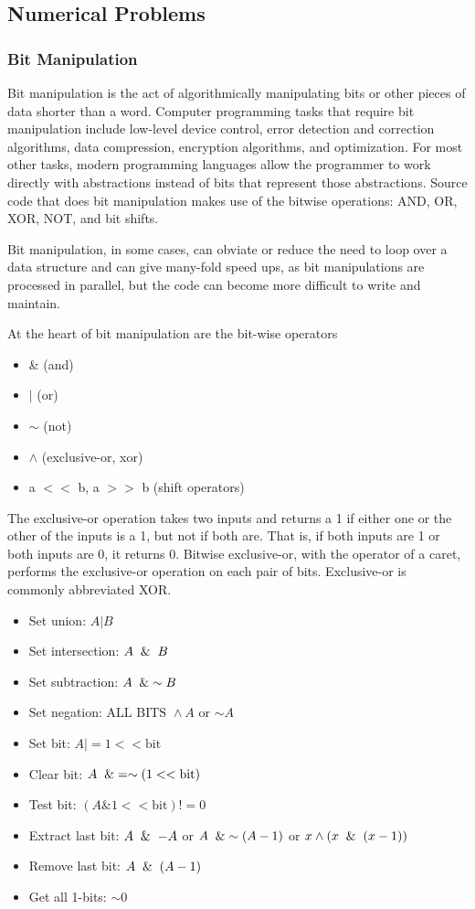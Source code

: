 \documentclass{article}
\begin{document}
    \subsection{Numerical Problems}
    
    \subsubsection{Bit Manipulation}
    Bit manipulation is the act of algorithmically manipulating bits or other pieces of data shorter than a word. Computer programming tasks that require bit manipulation include low-level device control, error detection and correction algorithms, data compression, encryption algorithms, and optimization. For most other tasks, modern programming languages allow the programmer to work directly with abstractions instead of bits that represent those abstractions. Source code that does bit manipulation makes use of the bitwise operations: AND, OR, XOR, NOT, and bit shifts.
    
    Bit manipulation, in some cases, can obviate or reduce the need to loop over a data structure and can give many-fold speed ups, as bit manipulations are processed in parallel, but the code can become more difficult to write and maintain.
    
    At the heart of bit manipulation are the bit-wise operators \begin{itemize}
        \item \& (and)
        \item $\vert$ (or)
        \item $\sim$ (not)
        \item $\wedge$ (exclusive-or, xor)
        \item a $<<$ b, a $>>$ b (shift operators)
    \end{itemize}
    The exclusive-or operation takes two inputs and returns a 1 if either one or the other of the inputs is a 1, but not if both are. That is, if both inputs are 1 or both inputs are 0, it returns 0. Bitwise exclusive-or, with the operator of a caret, performs the exclusive-or operation on each pair of bits. Exclusive-or is commonly abbreviated XOR.
    
    \begin{itemize}
        \item Set union: $A \vert B$
        \item Set intersection: $A \And B$
        \item Set subtraction: $A \And \sim B$
        \item Set negation: $\text{ALL BITS } \wedge A$ or $\sim A$
        \item Set bit: $A \vert= 1 <<  \text{bit}$
        \item Clear bit: $A \And = \sim (1 << \text{bit})$
        \item Test bit: $(A \& 1 << \text{bit}) != 0$
        \item Extract last bit: $A\And-A$ or $A \And \sim (A-1)$ or $x\wedge (x \And (x -1))$
        \item Remove last bit: $A \And (A-1)$
        \item Get all 1-bits: $\sim 0$
    \end{itemize}
    
\end{document}
